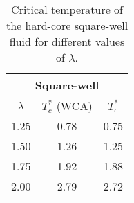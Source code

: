 \begin{table}[h]
	\caption{Critical temperature of the hard-core square-well fluid for different values of $\lambda$.}
	\begin{center}
		\begin{tabular}{|c|c|c|}
			\hline
			\multicolumn{3}{|c|}{Square-well}\\
			\hline
			$\lambda$ & $T_c^*$ (WCA) & $T_c^*$ \cite{KreiciNezbeda2012} \\
			\hline
			1.25 & 0.78 & 0.75 \\
			1.50 & 1.26 & 1.25 \\
			1.75 & 1.92 & 1.88 \\
			2.00  & 2.79 & 2.72 \\
			\hline
		\end{tabular}
	\end{center}
	\label{tab:sw_temp_cr}
\end{table}

